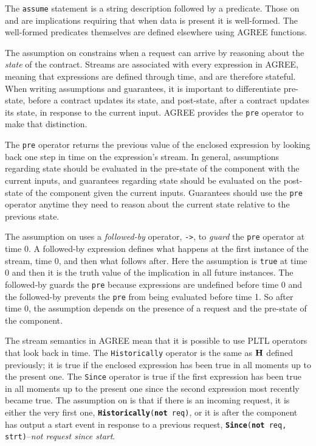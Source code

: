 The \texttt{assume} statement is a string description followed by a predicate.
Those on  and  are implications requiring that when data is present it is well-formed.
The well-formed predicates themselves are defined elsewhere using AGREE functions.

The assumption on  constrains when a request can arrive by reasoning about the \emph{state} of the contract.
Streams are associated with every expression in AGREE, meaning that expressions are defined through time, and are therefore stateful.
When writing assumptions and guarantees, it is important to differentiate pre-state, before a contract updates its state, and post-state, after a contract updates its state, in response to the current input. AGREE provides the \texttt{pre} operator to make that distinction.

The \texttt{pre} operator returns the previous value of the enclosed expression by looking back one step in time on the expression's stream.
In general, assumptions regarding state should be evaluated in the pre-state of the component with the current inputs, and guarantees regarding state should be evaluated on the post-state of the component given the current inputs.
Guarantees should use the \texttt{pre} operator anytime they need to reason about the current state relative to the previous state.

The assumption on  uses a \emph{followed-by} operator, \texttt{->}, to \emph{guard} the \texttt{pre} operator at time 0.
A followed-by expression defines what happens at the first instance of the stream, time 0, and then what follows after.
Here the assumption is \texttt{true} at time 0 and then it is the truth value of the implication in all future instances.
The followed-by guards the \texttt{pre} because expressions are undefined before time 0 and the followed-by prevents the \texttt{pre} from being evaluated before time 1.
So after time 0, the assumption depends on the presence of a request and the pre-state of the component.

The stream semantics in AGREE mean that it is possible to use PLTL operators that look back in time.
The \texttt{Historically} operator is the same as $\mathbf{H}$ defined previously; it is true if the enclosed expression has been true in all moments up to the present one.
The \texttt{Since} operator is true if the first expression has been true in all moments up to the present one since the second expression most recently became true.
The assumption on  is that if there is an incoming request, it is either the very first one, \texttt{\textbf{Historically}(\textbf{not} req)}, or it is after the component has output a start event in response to a previous request, \texttt{\textbf{Since}(\textbf{not} req, strt)}--\emph{not request since start}.

